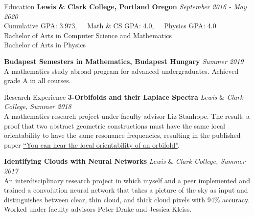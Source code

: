 \documentclass{resume}
\begin{document}
\begin{rSection}{Education}
    \textbf{Lewis \& Clark College, Portland Oregon} \hfill \textit{September 2016 - May 2020}\\
    Cumulative GPA: 3.973,\ \ \ Math \& CS GPA: 4.0,\ \ \  Physics GPA:
    4.0\\
    Bachelor of Arts in Computer Science and Mathematics\\
    Bachelor of Arts in Physics

    \textbf{Budapest Semesters in Mathematics, Budapest Hungary} \hfill \textit{Summer 2019}\\
    A mathematics study abroad program for advanced undergraduates. Achieved grade A in all courses.
\end{rSection}

\begin{rSection}{Research Experience}
    \textbf{3-Orbifolds and their Laplace Spectra} \hfill
    \textit{Lewis} \& \textit{Clark College, Summer 2018}\\
    A mathematics research project under faculty advisor Liz Stanhope. The result: a proof that two abstract geometric constructions must have the same local orientability to have the same resonance frequencies, resulting in the published paper 
\href{https://www.sciencedirect.com/science/article/pii/S092622451930097X?utm_campaign=STMJ_75273_AUTH_SERV_PPUB&utm_medium=email&utm_dgroup=Email1Publishing&utm_acid=-800555120&SIS_ID=-1&dgcid=STMJ_75273_AUTH_SERV_PPUB&CMX_ID=&utm_in=DM597592&utm_source=AC_30}
{``You can hear the local orientability of an orbifold''}.


\textbf{Identifying Clouds with Neural Networks} \hfill
\textit{Lewis} \& \textit{Clark College, Summer 2017}\\
An interdisciplinary research project in which myself and a peer implemented and trained a convolution neural network that takes a picture of the sky as input and distinguishes between clear, thin cloud, and thick cloud pixels with 94\% accuracy. Worked under faculty advisors Peter Drake and Jessica Kleiss.


\end{rSection}
\end{document}
